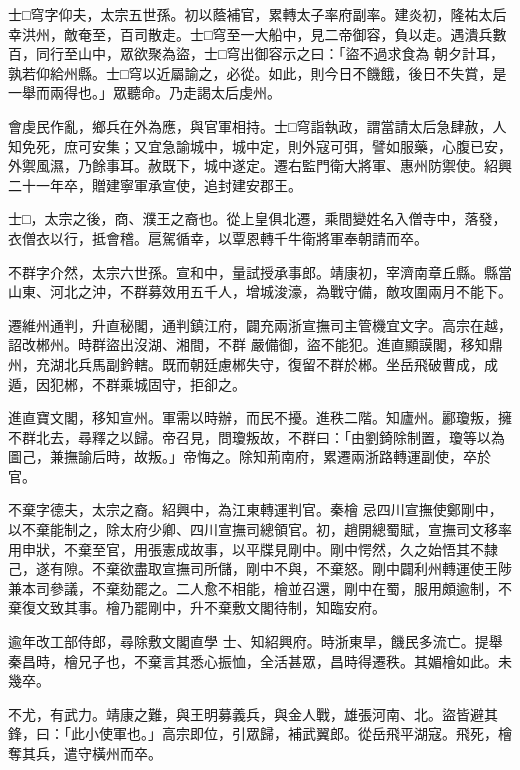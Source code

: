 \begin{pinyinscope}
 士□穹字仰夫，太宗五世孫。初以蔭補官，累轉太子率府副率。建炎初，隆祐太后幸洪州，敵奄至，百司散走。士□穹至一大船中，見二帝御容，負以走。遇潰兵數百，同行至山中，眾欲聚為盜，士□穹出御容示之曰：「盜不過求食為
 朝夕計耳，孰若仰給州縣。士□穹以近屬諭之，必從。如此，則今日不饑餓，後日不失賞，是一舉而兩得也。」眾聽命。乃走謁太后虔州。



 會虔民作亂，鄉兵在外為應，與官軍相持。士□穹詣執政，謂當請太后急肆赦，人知免死，庶可安集；又宜急諭城中，城中定，則外寇可弭，譬如服藥，心腹已安，外禦風濕，乃餘事耳。赦既下，城中遂定。遷右監門衛大將軍、惠州防禦使。紹興二十一年卒，贈建寧軍承宣使，追封建安郡王。



 士□，太宗之後，商、濮王之裔也。從上皇俱北遷，乘間變姓名入僧寺中，落發，衣僧衣以行，抵會稽。扈駕循幸，以覃恩轉千牛衛將軍奉朝請而卒。



 不群字介然，太宗六世孫。宣和中，量試授承事郎。靖康初，宰濟南章丘縣。縣當山東、河北之沖，不群募效用五千人，增城浚濠，為戰守備，敵攻圍兩月不能下。



 遷維州通判，升直秘閣，通判鎮江府，闢充兩浙宣撫司主管機宜文字。高宗在越，詔改郴州。時群盜出沒湖、湘間，不群
 嚴備御，盜不能犯。進直顯謨閣，移知鼎州，充湖北兵馬副鈐轄。既而朝廷慮郴失守，復留不群於郴。坐岳飛破曹成，成遁，因犯郴，不群乘城固守，拒卻之。



 進直寶文閣，移知宣州。軍需以時辦，而民不擾。進秩二階。知廬州。酈瓊叛，擁不群北去，尋釋之以歸。帝召見，問瓊叛故，不群曰：「由劉錡除制置，瓊等以為圖己，兼撫諭后時，故叛。」帝悔之。除知荊南府，累遷兩浙路轉運副使，卒於官。



 不棄字德夫，太宗之裔。紹興中，為江東轉運判官。秦檜
 忌四川宣撫使鄭剛中，以不棄能制之，除太府少卿、四川宣撫司總領官。初，趙開總蜀賦，宣撫司文移率用申狀，不棄至官，用張憲成故事，以平牒見剛中。剛中愕然，久之始悟其不隸己，遂有隙。不棄欲盡取宣撫司所儲，剛中不與，不棄怒。剛中闢利州轉運使王陟兼本司參議，不棄劾罷之。二人愈不相能，檜並召還，剛中在蜀，服用頗逾制，不棄復文致其事。檜乃罷剛中，升不棄敷文閣待制，知臨安府。



 逾年改工部侍郎，尋除敷文閣直學
 士、知紹興府。時浙東旱，饑民多流亡。提舉秦昌時，檜兄子也，不棄言其悉心振恤，全活甚眾，昌時得遷秩。其媚檜如此。未幾卒。



 不尤，有武力。靖康之難，與王明募義兵，與金人戰，雄張河南、北。盜皆避其鋒，曰：「此小使軍也。」高宗即位，引眾歸，補武翼郎。從岳飛平湖寇。飛死，檜奪其兵，遣守橫州而卒。




\end{pinyinscope}
